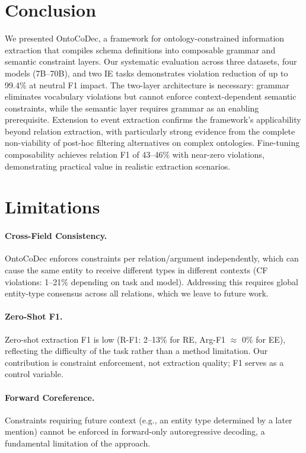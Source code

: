 \documentclass[11pt]{article}
\begin{document}
\section{Conclusion}

We presented OntoCoDec, a framework for ontology-constrained information extraction that compiles schema definitions into composable grammar and semantic constraint layers.
Our systematic evaluation across three datasets, four models (7B--70B), and two IE tasks demonstrates violation reduction of up to 99.4\% at neutral F1 impact.
The two-layer architecture is necessary: grammar eliminates vocabulary violations but cannot enforce context-dependent semantic constraints, while the semantic layer requires grammar as an enabling prerequisite.
Extension to event extraction confirms the framework's applicability beyond relation extraction, with particularly strong evidence from the complete non-viability of post-hoc filtering alternatives on complex ontologies.
Fine-tuning composability achieves relation F1 of 43--46\% with near-zero violations, demonstrating practical value in realistic extraction scenarios.

\section*{Limitations}

\paragraph{Cross-Field Consistency.}
OntoCoDec enforces constraints per relation/argument independently, which can cause the same entity to receive different types in different contexts (CF violations: 1--21\% depending on task and model).
Addressing this requires global entity-type consensus across all relations, which we leave to future work.

\paragraph{Zero-Shot F1.}
Zero-shot extraction F1 is low (R-F1: 2--13\% for RE, Arg-F1 $\approx$ 0\% for EE), reflecting the difficulty of the task rather than a method limitation.
Our contribution is constraint enforcement, not extraction quality; F1 serves as a control variable.

\paragraph{Forward Coreference.}
Constraints requiring future context (e.g., an entity type determined by a later mention) cannot be enforced in forward-only autoregressive decoding, a fundamental limitation of the approach.
\end{document}
